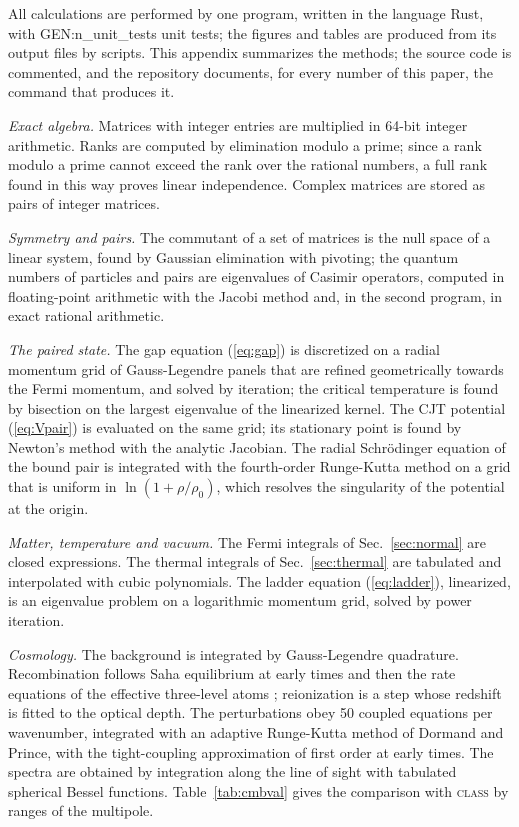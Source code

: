 All calculations are performed by one program, written in the language Rust, with
{{GEN:n_unit_tests}} unit tests; the figures and tables are produced from its output files by
scripts. This appendix summarizes the methods; the source code is commented, and the repository
\cite{SpacetimesRepo} documents, for every number of this paper, the command that produces it.

\emph{Exact algebra.} Matrices with integer entries are multiplied in 64-bit integer arithmetic.
Ranks are computed by elimination modulo a prime; since a rank modulo a prime cannot exceed the rank
over the rational numbers, a full rank found in this way proves linear independence. Complex
matrices are stored as pairs of integer matrices.

\emph{Symmetry and pairs.} The commutant of a set of matrices is the null space of a linear system,
found by Gaussian elimination with pivoting; the quantum numbers of particles and pairs are
eigenvalues of Casimir operators, computed in floating-point arithmetic with the Jacobi method and,
in the second program, in exact rational arithmetic.

\emph{The paired state.} The gap equation (\ref{eq:gap}) is discretized on a radial momentum grid of
Gauss-Legendre panels that are refined geometrically towards the Fermi momentum, and solved by
iteration; the critical temperature is found by bisection on the largest eigenvalue of the linearized
kernel. The CJT potential (\ref{eq:Vpair}) is evaluated on the same grid; its stationary point is
found by Newton's method with the analytic Jacobian. The radial Schr\"odinger equation of the bound
pair is integrated with the fourth-order Runge-Kutta method on a grid that is uniform in
$\ln(1+\rho/\rho_0)$, which resolves the singularity of the potential at the origin.

\emph{Matter, temperature and vacuum.} The Fermi integrals of Sec.~\ref{sec:normal} are closed
expressions. The thermal integrals of Sec.~\ref{sec:thermal} are tabulated and interpolated with
cubic polynomials. The ladder equation (\ref{eq:ladder}), linearized, is an eigenvalue problem on a
logarithmic momentum grid, solved by power iteration.

\emph{Cosmology.} The background is integrated by Gauss-Legendre quadrature. Recombination follows
Saha equilibrium at early times and then the rate equations of the effective three-level atoms
\cite{SeagerSasselovScott1999,SeagerSasselovScott2000,WongMossScott2008}; reionization is a step
whose redshift is fitted to the optical depth. The perturbations obey 50 coupled equations per
wavenumber, integrated with an adaptive Runge-Kutta method of Dormand and Prince, with the
tight-coupling approximation of first order at early times. The spectra are obtained by integration
along the line of sight with tabulated spherical Bessel functions. Table~\ref{tab:cmbval} gives the
comparison with \textsc{class} by ranges of the multipole.


